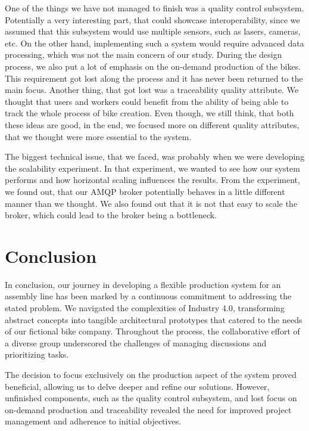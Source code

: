 \documentclass[conference]{IEEEtran}
\begin{document}
One of the things we have not managed to finish was a quality control subsystem. Potentially a very interesting part, that could showcase interoperability, since we assumed that this subsystem would use multiple sensors, such as lasers, cameras, etc. On the other hand, implementing such a system would require advanced data processing, which was not the main concern of our study. During the design process, we also put a lot of emphasis on the on-demand production of the bikes. This requirement got lost along the process and it has never been returned to the main focus. Another thing, that got lost was a traceability quality attribute. We thought that users and workers could benefit from the ability of being able to track the whole process of bike creation. Even though, we still think, that both these ideas are good, in the end, we focused more on different quality attributes, that we thought were more essential to the system.

The biggest technical issue, that we faced, was probably when we were developing the scalability experiment. In that experiment, we wanted to see how our system performs and how horizontal scaling influences the results. From the experiment, we found out, that our AMQP broker potentially behaves in a little different manner than we thought. We also found out that it is not that easy to scale the broker, which could lead to the broker being a bottleneck. %


\section{Conclusion}
In conclusion, our journey in developing a flexible production system for an assembly line has been marked by a continuous commitment to addressing the stated problem. We navigated the complexities of Industry 4.0, transforming abstract concepts into tangible architectural prototypes that catered to the needs of our fictional bike company. Throughout the process, the collaborative effort of a diverse group underscored the challenges of managing discussions and prioritizing tasks.

The decision to focus exclusively on the production aspect of the system proved beneficial, allowing us to delve deeper and refine our solutions. However, unfinished components, such as the quality control subsystem, and lost focus on on-demand production and traceability revealed the need for improved project management and adherence to initial objectives.
\end{document}
